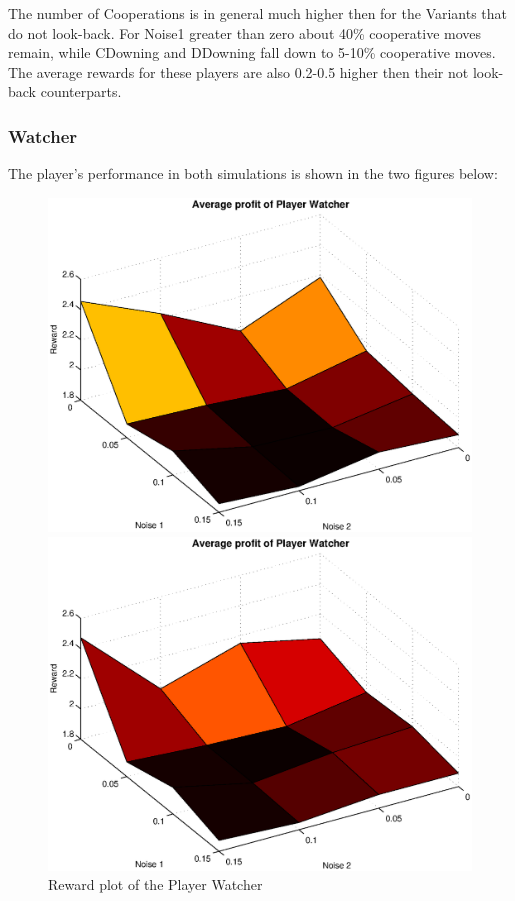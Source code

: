 \documentclass[11pt,twoside]{article}
\begin{document}
The number of Cooperations is in general much higher then for the Variants that do not look-back. For Noise1 greater than zero about 40\% cooperative moves remain, while CDowning and DDowning fall down to 5-10\% cooperative moves. The average rewards for these players are also 0.2-0.5 higher then their not look-back counterparts.

\newpage
\subsubsection{Watcher}
The player's performance in both simulations is shown in the two figures below:
\begin{figure}[h]

\begin{minipage}[hbt]{0.65\textwidth}
	\centering
	\includegraphics[width=\textwidth]{pics/simulation1/Reward_vs_Noise_of_Player_Watcher}
\end{minipage}
\hfill
\begin{minipage}[hbt]{0.3\textwidth}
	\centering
	\includegraphics[width=\textwidth]{pics/simulation2/Reward_vs_Noise_of_Player_Watcher}
\end{minipage}
	\caption{Reward plot of the Player Watcher}
	\label{pic player watcher}
\end{figure}
\end{document}
